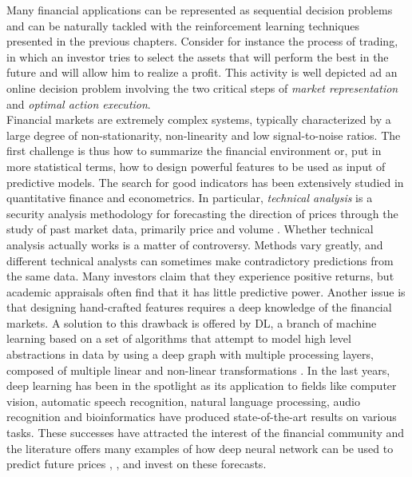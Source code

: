 Many financial applications can be represented as sequential decision problems and can be naturally tackled with the reinforcement learning techniques presented in the previous chapters. Consider for instance the process of trading, in which an investor tries to select the assets that will perform the best in the future and will allow him to realize a profit. This activity is well depicted ad an online decision problem involving the two critical steps of \emph{market representation} and \emph{optimal action execution}.\\
Financial markets are extremely complex systems, typically characterized by a large degree of non-stationarity, non-linearity and low signal-to-noise ratios. The first challenge is thus how to summarize the financial environment or, put in more statistical terms, how to design powerful features to be used as input of predictive models. The search for good indicators has been extensively studied in quantitative finance and econometrics. In particular, \emph{technical analysis} is a security analysis methodology for forecasting the direction of prices through the study of past market data, primarily price and volume \cite{lo2000foundations}. Whether technical analysis actually works is a matter of controversy. Methods vary greatly, and different technical analysts can sometimes make contradictory predictions from the same data. Many investors claim that they experience positive returns, but academic appraisals often find that it has little predictive power. Another issue is that designing hand-crafted features requires a deep knowledge of the financial markets. A solution to this drawback is offered by \gls{DL}, a branch of machine learning based on a set of algorithms that attempt to model high level abstractions in data by using a deep graph with multiple processing layers, composed of multiple linear and non-linear transformations \cite{Goodfellow-et-al-2016-Book}. In the last years, deep learning has been in the spotlight as its application to fields like computer vision, automatic speech recognition, natural language processing, audio recognition and bioinformatics have produced state-of-the-art results on various tasks. These successes have attracted the interest of the financial community and the literature offers many examples of how deep neural network can be used to predict future prices \cite{kamijo1990stock}, \cite{saad1998comparative}, \cite{liang2011stock} and invest on these forecasts.\\ 
